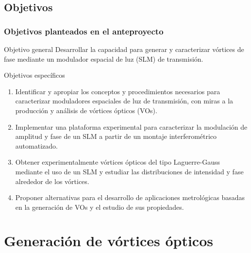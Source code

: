 \documentclass[xcolor=table,serif]{beamer}
\begin{document}
\subsection{Objetivos}
\begin{frame}
  \frametitle{Objetivos planteados en el anteproyecto}
  \begin{block}{Objetivo general}
    Desarrollar la capacidad para generar y caracterizar vórtices de fase
    mediante un modulador espacial de luz (SLM) de transmisión. 
  \end{block}
  \begin{block}{Objetivos espec\'ificos}
    \small
    \begin{enumerate}
	\item Identificar y apropiar los conceptos y
                  procedimientos necesarios para caracterizar
                  moduladores espaciales de luz de transmisión, con
                  miras a la producción y análisis de vórtices
                  ópticos (VOs). 
        \item Implementar una plataforma experimental para
                  caracterizar la modulación de amplitud y fase de un
                  SLM a partir de un montaje interferométrico
                  automatizado. 
         \item Obtener experimentalmente vórtices ópticos del
                  tipo Laguerre-Gauss mediante el uso de un SLM y
                  estudiar las distribuciones de intensidad y fase
                  alrededor de los vórtices. 
         \item Proponer alternativas para el desarrollo de
                  aplicaciones metrológicas basadas en la generación
                  de VOs y el estudio de sus propiedades.
       \end{enumerate}
     \end{block}
   \end{frame}

\section{Generación de vórtices ópticos}
\end{document}
